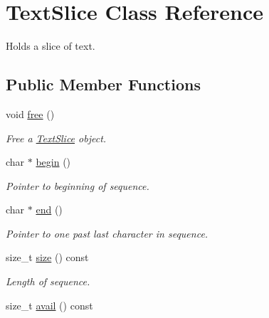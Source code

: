 \hypertarget{classTextSlice}{}\section{Text\+Slice Class Reference}
\label{classTextSlice}


Holds a slice of text.  


\subsection*{Public Member Functions}
\begin{DoxyCompactItemize}
\item 
\hypertarget{classTextSlice_a0446e0a101ca879282642f57c9c111a1}{}void \hyperlink{classTextSlice_a0446e0a101ca879282642f57c9c111a1}{free} ()\label{classTextSlice_a0446e0a101ca879282642f57c9c111a1}

\begin{DoxyCompactList}\small\item\em Free a \hyperlink{classTextSlice}{Text\+Slice} object. \end{DoxyCompactList}\item 
\hypertarget{classTextSlice_ad23e97b0958769c99932a36cfbfade46}{}char $\ast$ \hyperlink{classTextSlice_ad23e97b0958769c99932a36cfbfade46}{begin} ()\label{classTextSlice_ad23e97b0958769c99932a36cfbfade46}

\begin{DoxyCompactList}\small\item\em Pointer to beginning of sequence. \end{DoxyCompactList}\item 
\hypertarget{classTextSlice_a30714d1a25fdc3b1360592299ade57f2}{}char $\ast$ \hyperlink{classTextSlice_a30714d1a25fdc3b1360592299ade57f2}{end} ()\label{classTextSlice_a30714d1a25fdc3b1360592299ade57f2}

\begin{DoxyCompactList}\small\item\em Pointer to one past last character in sequence. \end{DoxyCompactList}\item 
\hypertarget{classTextSlice_a7d925401018780af8cb87c794105f02a}{}size\+\_\+t \hyperlink{classTextSlice_a7d925401018780af8cb87c794105f02a}{size} () const \label{classTextSlice_a7d925401018780af8cb87c794105f02a}

\begin{DoxyCompactList}\small\item\em Length of sequence. \end{DoxyCompactList}\item 
\hypertarget{classTextSlice_ac46a02ee60eaa481c0f6845704aae7b3}{}size\+\_\+t \hyperlink{classTextSlice_ac46a02ee60eaa481c0f6845704aae7b3}{avail} () const \label{classTextSlice_ac46a02ee60eaa481c0f6845704aae7b3}


\end{DoxyCompactItemize}
